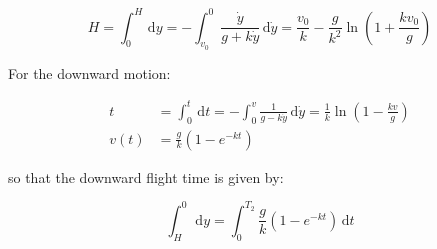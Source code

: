 \documentclass[12pt]{article}
\begin{document}
\begin{equation}
    H = \int_{0}^{H} \, \mathrm{d}y = -\int_{v_{0}}^{0} \frac{\dot{y}}{g + k\dot{y}} \, \mathrm{d}\dot{y} = \frac{v_{0}}{k} - \frac{g}{k^{2}} \ln{\left( 1 + \frac{k v_{0}}{g} \right)}
\end{equation}

For the downward motion:

\begin{equation}
\begin{split}
    t &= \int_{0}^{t} \, \mathrm{d}t = -\int_{0}^{v} \frac{1}{g - k\dot{y}} \, \mathrm{d}\dot{y} = \frac{1}{k} \ln{\left( 1 - \frac{kv}{g} \right)} \\
    v(t) &= \frac{g}{k} \left( 1 - e^{-kt} \right)
\end{split}
\end{equation}

so that the downward flight time is given by:

\begin{equation}
    \int_{H}^{0} \, \mathrm{d}y = \int_{0}^{T_{2}} \frac{g}{k} \left( 1 - e^{-kt} \right) \, \mathrm{d}t
\end{equation}

    
\end{document}
